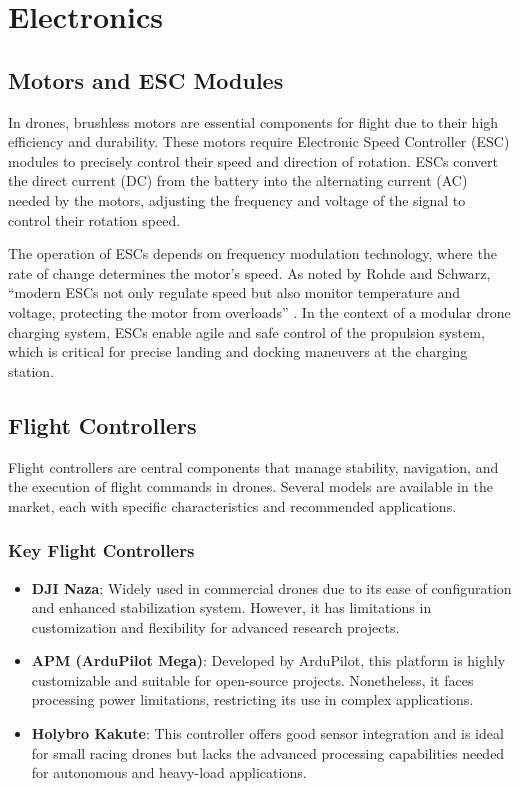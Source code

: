 \section{Electronics}

\subsection{Motors and ESC Modules}

In drones, brushless motors are essential components for flight due to their high efficiency and durability. These motors require Electronic Speed Controller (ESC) modules to precisely control their speed and direction of rotation. ESCs convert the direct current (DC) from the battery into the alternating current (AC) needed by the motors, adjusting the frequency and voltage of the signal to control their rotation speed.

The operation of ESCs depends on frequency modulation technology, where the rate of change determines the motor's speed. As noted by Rohde and Schwarz, “modern ESCs not only regulate speed but also monitor temperature and voltage, protecting the motor from overloads” \cite{rohdE_ESC}. In the context of a modular drone charging system, ESCs enable agile and safe control of the propulsion system, which is critical for precise landing and docking maneuvers at the charging station.

\subsection{Flight Controllers}

Flight controllers are central components that manage stability, navigation, and the execution of flight commands in drones. Several models are available in the market, each with specific characteristics and recommended applications.

\subsubsection{Key Flight Controllers}
\begin{itemize}
    \item \textbf{DJI Naza}: Widely used in commercial drones due to its ease of configuration and enhanced stabilization system. However, it has limitations in customization and flexibility for advanced research projects.
    \item \textbf{APM (ArduPilot Mega)}: Developed by ArduPilot, this platform is highly customizable and suitable for open-source projects. Nonetheless, it faces processing power limitations, restricting its use in complex applications.
    \item \textbf{Holybro Kakute}: This controller offers good sensor integration and is ideal for small racing drones but lacks the advanced processing capabilities needed for autonomous and heavy-load applications.
\end{itemize}

